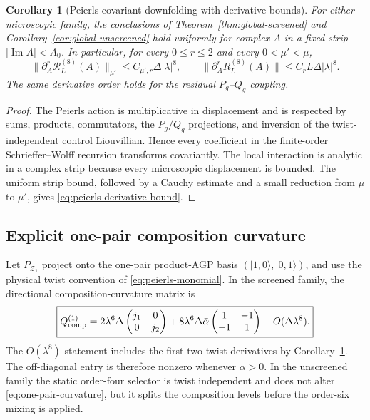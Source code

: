 \documentclass[11pt]{article}
\newtheorem{corollary}[theorem]{Corollary}
\theoremstyle{definition}
\theoremstyle{remark}
\newcommand{\cZ}{\mathcal Z}
\newcommand{\ket}[1]{\lvert #1\rangle}
\newcommand{\abs}[1]{\lvert #1\rvert}
\newcommand{\norm}[1]{\lVert #1\rVert}
\begin{document}
\begin{corollary}[Peierls-covariant downfolding with derivative bounds]
\label{cor:peierls}
For either microscopic family, the conclusions of Theorem~\ref{thm:global-screened} and Corollary~\ref{cor:global-unscreened} hold uniformly for complex $A$ in a fixed strip $\abs{\operatorname{Im}A}<A_0$.  In particular, for every $0\le r\le2$ and every $0<\mu'<\mu$,
\begin{equation}
 \boxed{\norm{\partial_A^r\mathcal R_L^{(8)}(A)}_{\mu'}
 \le C_{\mu',r}\Delta\abs\lambda^8,}
 \qquad
 \boxed{\norm{\partial_A^rR_L^{(8)}(A)}
 \le C_rL\Delta\abs\lambda^8.}
 \label{eq:peierls-derivative-bound}
\end{equation}
The same derivative order holds for the residual $P_g$--$Q_g$ coupling.
\end{corollary}

\begin{proof}
The Peierls action is multiplicative in displacement and is respected by sums, products, commutators, the $P_g/Q_g$ projections, and inversion of the twist-independent control Liouvillian.  Hence every coefficient in the finite-order Schrieffer--Wolff recursion transforms covariantly.  The local interaction is analytic in a complex strip because every microscopic displacement is bounded.  The uniform strip bound, followed by a Cauchy estimate and a small reduction from $\mu$ to $\mu'$, gives \eqref{eq:peierls-derivative-bound}.
\end{proof}

\subsection{Explicit one-pair composition curvature}

Let $P_{\cZ_1}$ project onto the one-pair product-AGP basis $(\ket{1,0},\ket{0,1})$, and use the physical twist convention of \eqref{eq:peierls-monomial}.  In the screened family, the directional composition-curvature matrix is
\begin{equation}
\boxed{
 Q_{\rm comp}^{(1)}
 =2\lambda^6\Delta
 \begin{pmatrix}j_1&0\\0&j_2\end{pmatrix}
 +8\lambda^6\Delta\bar\alpha
 \begin{pmatrix}1&-1\\-1&1\end{pmatrix}
 +O(\Delta\lambda^8).
}
\label{eq:one-pair-curvature}
\end{equation}
The $O(\lambda^8)$ statement includes the first two twist derivatives by Corollary~\ref{cor:peierls}.  The off-diagonal entry is therefore nonzero whenever $\bar\alpha>0$.  In the unscreened family the static order-four selector is twist independent and does not alter \eqref{eq:one-pair-curvature}, but it splits the composition levels before the order-six mixing is applied.
\end{document}

